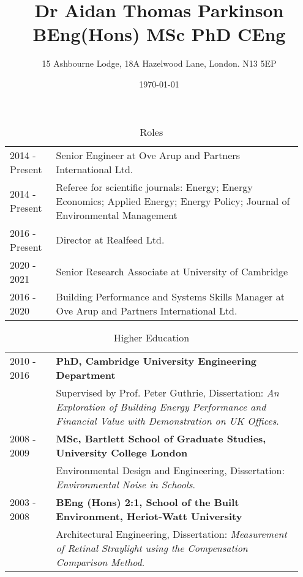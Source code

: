 \documentclass[11pt, oneside]{article}   	%
\title{Dr Aidan Thomas Parkinson BEng(Hons) MSc PhD CEng}
\author{15 Ashbourne Lodge, 18A Hazelwood Lane, London. N13 5EP}
\date{\today}							%
\begin{document}
\maketitle

\begin{table}[h]
\caption*{Roles}
\vspace{-5mm}
\small
\begin{center}
\begin{tabular}{p{0.15\linewidth} p{0.8\linewidth}}
\hline
2014 - Present&Senior Engineer at Ove Arup and Partners International Ltd. \\
2014 - Present&Referee for scientific journals: Energy; Energy Economics; Applied Energy; Energy Policy; Journal of Environmental Management \\
2016 - Present&Director at Realfeed Ltd.  \\
2020 - 2021&Senior Research Associate at University of Cambridge  \\
2016 - 2020&Building Performance and Systems Skills Manager at Ove Arup and Partners International Ltd.  \\
\hline
\end{tabular}
\end{center}
\vspace{-10mm}
\end{table}

\begin{table}[h]
\caption*{Higher Education}
\vspace{-5mm}
\small
\begin{center}
\begin{tabular}{p{0.15\linewidth} p{0.8\linewidth}}
\hline
2010 - 2016&\textbf{PhD, Cambridge University Engineering Department} \\
&Supervised by Prof. Peter Guthrie, Dissertation: \emph{An Exploration of Building Energy Performance and Financial Value with Demonstration on UK Offices}. \\
2008 - 2009&\textbf{MSc, Bartlett School of Graduate Studies, University College London} \\
&Environmental Design and Engineering, Dissertation: \emph{Environmental Noise in Schools}. \\
2003 - 2008&\textbf{BEng (Hons) 2:1, School of the Built Environment, Heriot-Watt University} \\
&Architectural Engineering, Dissertation: \emph{Measurement of Retinal Straylight using the Compensation Comparison Method}. \\
\hline
\end{tabular}
\end{center}
\vspace{-10mm}
\end{table}
\end{document}
